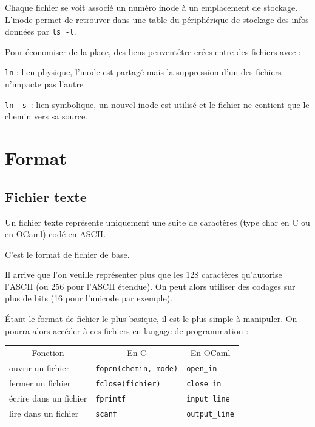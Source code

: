 \begin{definition}
	Chaque fichier se voit associé un numéro inode à un emplacement de stockage. L'inode permet de retrouver dans une table du périphérique de stockage des infos données par \texttt{ls -l}.
\end{definition}

\begin{definition}
	Pour économiser de la place, des liens peuventêtre crées entre des fichiers avec :
	
	\qquad \texttt{ln} : lien physique, l'inode est partagé mais la suppression d'un des fichiers n'impacte pas l'autre
	
	\qquad \texttt{ln -s} : lien symbolique, un nouvel inode est utilisé et le fichier ne contient que le chemin vers sa source.

\end{definition}

\section{Format}

\subsection{Fichier texte}

\begin{definition}
	Un fichier texte représente uniquement une suite de caractères (type char en C ou en OCaml) codé en ASCII.
\end{definition}

\begin{rem}
	C'est le format de fichier de base.
\end{rem}

\begin{rem}
	Il arrive que l'on veuille représenter plus que les 128 caractères qu'autorise l'ASCII (ou 256 pour l'ASCII étendue). On peut alors utiliser des codages sur plus de bits (16 pour l'unicode par exemple).
\end{rem}

\begin{definition}
	Étant le format de fichier le plus basique, il est le plus simple à manipuler. On pourra alors accéder à ces fichiers en langage de programmation :\\
	\begin{tabular}{l|l|l}
		\multicolumn{1}{c}{Fonction} & \multicolumn{1}{|c|}{En C} & \multicolumn{1}{c}{En OCaml}\\
		ouvrir un fichier &  \texttt{fopen(chemin, mode)} & \texttt{open\_in} \\
		fermer un fichier & \texttt{fclose(fichier)} & \texttt{close\_in} \\
		écrire dans un fichier & \texttt{fprintf} & \texttt{input\_line} \\
		lire dans un fichier & \texttt{scanf} & \texttt{output\_line}
	\end{tabular}
\end{definition}

